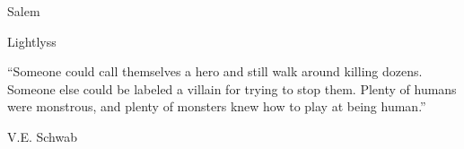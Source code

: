 \begin{BookTitle}
Salem
\end{BookTitle}
\begin{Author}
Lightlyss
\end{Author}
\begin{Epigraph}
``Someone could call themselves a hero and still walk around killing dozens.
Someone else could be labeled a villain for trying to stop them.
Plenty of humans were monstrous, and plenty of monsters knew how to play
at being human.''
\end{Epigraph}
\begin{EpigraphSource}
\textemdash{} V.E. Schwab
\end{EpigraphSource}
